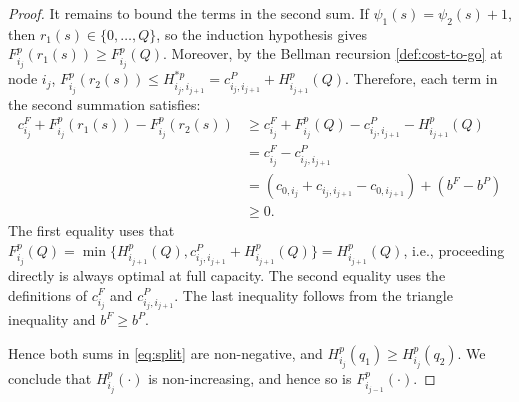 \documentclass[10pt,a4paper]{amsart}
\begin{document}
\begin{proof}
{It remains to bound the terms in the second sum. If
$\psi_1(s)=\psi_2(s)+1$, then $r_1(s)\in\{0,\dots,Q\}$, so the induction hypothesis
gives $F^p_{i_j}(r_1(s))\ge F^p_{i_j}(Q)$.
Moreover, by the Bellman recursion \eqref{def:cost-to-go} at node $i_j$, $F^p_{i_j}(r_2(s))
\le
H^{*p}_{i_j,i_{j+1}}
=
c^P_{i_j,i_{j+1}}+H^p_{i_{j+1}}(Q)$.
Therefore, each term in the second summation satisfies:
\begin{align*}
    c^F_{i_j} + F^p_{i_j}(r_1(s))-F^p_{i_j}(r_2(s)) & \geq c^F_{i_j}
+
F^p_{i_j}(Q)
-
c^P_{i_j,i_{j+1}}
-
H^p_{i_{j+1}}(Q) \\
&= c^F_{i_j}-c^P_{i_j,i_{j+1}} \\
&= \left(c_{0,i_j}+c_{i_j,i_{j+1}}-c_{0,i_{j+1}}\right)
+
\left(b^F-b^P\right) \\
& \geq 0.
\end{align*}
The first equality uses that $F^p_{i_j}(Q)=\min\{H^p_{i_{j+1}}(Q),c^P_{i_j, i_{j+1}} + H^p_{i_{j+1}}(Q)\}=H^p_{i_{j+1}}(Q)$, i.e., proceeding directly is always optimal at full capacity. The second equality uses the definitions of $c^F_{i_j}$ and $c^P_{i_j,i_{j+1}}$. The last inequality follows from the triangle inequality and
$b^F\ge b^P$. 

Hence both sums in \eqref{eq:split} are non-negative, and
$H^p_{i_j}(q_1)\ge H^p_{i_j}(q_2)$. We conclude that $H_{i_j}^p(\cdot)$ is non-increasing, and hence so is $F^p_{i_{j-1}}(\cdot)$.
}
\end{proof}
\end{document}
